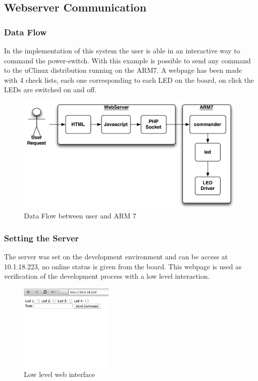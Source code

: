 \subsection{Webserver Communication}

\subsubsection{Data Flow}
In the implementation of this system the user is able in an interactive way to command the power-switch. With this example is possible to send any command to the uClinux distribution running on the ARM7.
A webpage has been made with 4 check lists, each one corresponding to each LED on the board,  on click the LEDs are switched on and off.
\begin{figure}[H]
	\begin{centering}
		 \includegraphics[width=1.0\textwidth,page=1]{images/dataflowPHP.pdf}
		\caption{Data Flow between user and ARM 7}
	\end{centering}
\end{figure}

\subsubsection{Setting the Server}
The server was set on the development environment and can be access at 10.1.18.223, no online status is given from the board. This webpage is used as verification of the development process with a low level interaction. 
\begin{figure}[H]
	\begin{centering}
		 \includegraphics[width=0.4\textwidth,page=1]{images/website.png}
		\caption{Low level web interface}
	\end{centering}
\end{figure}

